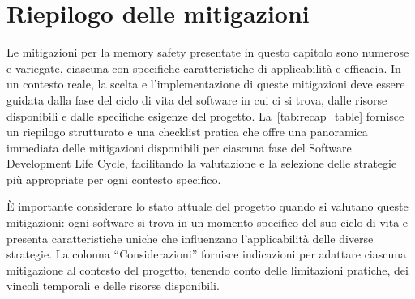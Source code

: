 \section{Riepilogo delle mitigazioni}
\label{sec:recap}

Le mitigazioni per la memory safety presentate in questo capitolo sono numerose e
variegate, ciascuna con specifiche caratteristiche di applicabilità e efficacia.
In un contesto reale, la scelta e l'implementazione di queste mitigazioni deve
essere guidata dalla fase del ciclo di vita del software in cui ci si trova, dalle
risorse disponibili e dalle specifiche esigenze del progetto. La~\autoref{tab:recap_table}
fornisce un riepilogo strutturato e una checklist pratica che offre una
panoramica immediata delle mitigazioni disponibili per ciascuna fase del
Software Development Life Cycle, facilitando la valutazione e la selezione delle
strategie più appropriate per ogni contesto specifico.

È importante considerare lo stato attuale del progetto quando si valutano queste
mitigazioni: ogni software si trova in un momento specifico del suo ciclo di
vita e presenta caratteristiche uniche che influenzano l'applicabilità delle
diverse strategie. La colonna ``Considerazioni'' fornisce indicazioni per adattare
ciascuna mitigazione al contesto del progetto, tenendo conto delle limitazioni
pratiche, dei vincoli temporali e delle risorse disponibili.

